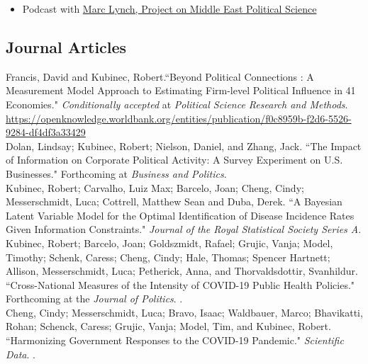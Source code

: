 \documentclass[11pt, a4paper]{article}
\newcommand{\years}[1]{\marginnote{\scriptsize #1}}
\begin{document}
\begin{itemize}
	\item Podcast with \href{https://pomeps.org/making-democracy-safe-for-business-apsa-virtual-posters-s-13-ep-1}{Marc Lynch, Project on Middle East Political Science}
\end{itemize}

 \newpage
 
\subsection*{Journal Articles}

\years{2025}  Francis, David and Kubinec, Robert.``Beyond Political Connections : A Measurement Model Approach to Estimating Firm-level Political Influence in 41 Economies." \emph{Conditionally accepted} at \emph{Political Science Research and Methods}. \url{https://openknowledge.worldbank.org/entities/publication/f0c8959b-f2d6-5526-9284-df4df3a33429}\\

\years{2025} Dolan, Lindsay; Kubinec, Robert; Nielson, Daniel, and Zhang, Jack. ``The Impact of Information on Corporate Political Activity: A Survey Experiment on U.S. Businesses." Forthcoming at \emph{Business and Politics}. \\

\years{2025} Kubinec, Robert; Carvalho, Luiz Max; Barcelo, Joan; Cheng, Cindy; Messerschmidt, Luca; Cottrell, Matthew Sean and Duba, Derek. ``A Bayesian Latent Variable Model for the Optimal Identification of Disease Incidence Rates Given Information Constraints." \emph{Journal of the Royal Statistical Society Series A}. \\

\years{2024} Kubinec, Robert; Barcelo, Joan; Goldszmidt, Rafael; Grujic, Vanja; Model, Timothy; Schenk, Caress; Cheng, Cindy; Hale, Thomas; Spencer Hartnett; Allison, Messerschmidt, Luca; Petherick, Anna, and Thorvaldsdottir, Svanhildur. ``Cross-National Measures of the Intensity of COVID-19 Public Health Policies." Forthcoming at the \emph{Journal of Politics}. .\\

\years{2024} Cheng, Cindy; Messerschmidt, Luca; Bravo, Isaac; Waldbauer, Marco; Bhavikatti, Rohan; Schenck, Caress; Grujic, Vanja; Model, Tim, and Kubinec, Robert. ``Harmonizing Government Responses to the COVID-19 Pandemic." \emph{Scientific Data}. .\\
\end{document}
